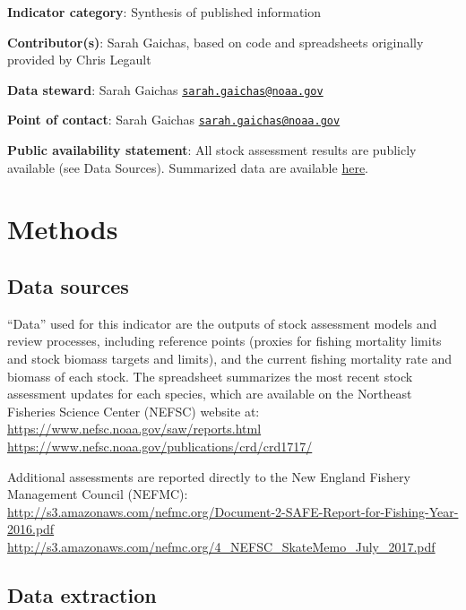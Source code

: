 \documentclass[
]{book}
\begin{document}
\textbf{Indicator category}: Synthesis of published information

\textbf{Contributor(s)}: Sarah Gaichas, based on code and spreadsheets originally provided by Chris Legault

\textbf{Data steward}: Sarah Gaichas \href{mailto:sarah.gaichas@noaa.gov}{\nolinkurl{sarah.gaichas@noaa.gov}}

\textbf{Point of contact}: Sarah Gaichas \href{mailto:sarah.gaichas@noaa.gov}{\nolinkurl{sarah.gaichas@noaa.gov}}

\textbf{Public availability statement}: All stock assessment results are publicly available (see Data Sources). Summarized data are available \href{http://comet.nefsc.noaa.gov/erddap/tabledap/assess_soe_v1.htmlTable?No,Entity_Name,Science_Center,Assessment_Year,Last_Data_Year,Assessment_Level,Citation,Comments,Best_F,F_Year,Flimit,Fmsy,F_Flimit,F_Fmsy,Best_B,B_Year,B_Blimit,B_Bmsy,Stock_Level_Relative_to_Bmsy,Bmsy,Blim}{here}.

\hypertarget{methods-35}{%
\section{Methods}\label{methods-35}}

\hypertarget{data-sources-35}{%
\subsection{Data sources}\label{data-sources-35}}

``Data'' used for this indicator are the outputs of stock assessment models and review processes, including reference points (proxies for fishing mortality limits and stock biomass targets and limits), and the current fishing mortality rate and biomass of each stock. The spreadsheet summarizes the most recent stock assessment updates for each species, which are available on the Northeast Fisheries Science Center (NEFSC) website at:
\url{https://www.nefsc.noaa.gov/saw/reports.html}\\
\url{https://www.nefsc.noaa.gov/publications/crd/crd1717/}

Additional assessments are reported directly to the New England Fishery Management Council (NEFMC):
\url{http://s3.amazonaws.com/nefmc.org/Document-2-SAFE-Report-for-Fishing-Year-2016.pdf}\\
\url{http://s3.amazonaws.com/nefmc.org/4_NEFSC_SkateMemo_July_2017.pdf}

\hypertarget{data-extraction-29}{%
\subsection{Data extraction}\label{data-extraction-29}}
\end{document}
